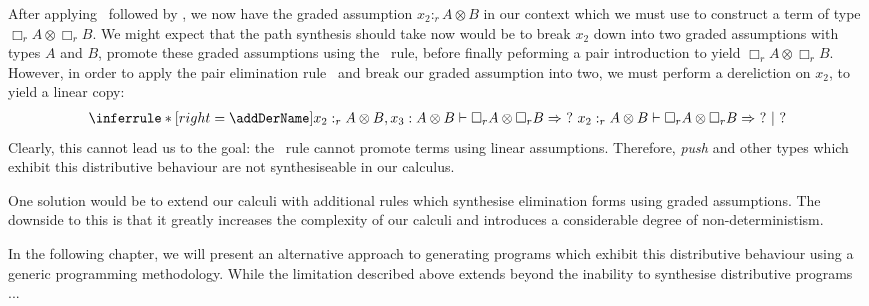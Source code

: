 After applying \addAbsName\ followed by \addUnboxName, we now have the graded
assumption $x_2 :_r A \otimes B$ in our context which we must use to construct a
term of type $\Box_r A \otimes \Box_r B$. We might expect that the path
synthesis should take now would be to break $x_2$ down into two graded
assumptions with types $A$ and $B$, promote these graded assumptions using the
\addBoxName\ rule, before finally peforming a pair introduction to yield $\Box_r
A \otimes \Box_r B$. However, in order to apply the pair elimination rule
\addPairElimName\  
and break our graded assumption into two, we must perform a dereliction on
$x_2$, to yield a linear copy: 
\begin{align*}
  \inferrule*[right=\addDerName]
      {x_2 :_r A \otimes B, x_3 : A \otimes B \vdash \Box_r A \otimes \Box_r B \Rightarrow\ ?\ }
      { x_2 :_r A \otimes B \vdash \Box_r A \otimes \Box_r B \Rightarrow\ ?\ |\ ? }
\end{align*}
Clearly, this cannot lead us to the goal: the \addBoxName\ rule cannot promote
terms using linear assumptions. Therefore, \textit{push} and other types which
exhibit this distributive behaviour are not synthesiseable in our calculus.

One solution would be to extend our calculi with additional rules which
synthesise elimination forms using graded assumptions. The downside to this is
that it greatly increases the complexity of our calculi and introduces 
a considerable degree of non-deterministism.  

In the following chapter, we will present an alternative approach to generating
programs which exhibit this distributive behaviour using a generic programming
methodology. While the limitation described above extends beyond the inability to 
synthesise distributive programs ... 




